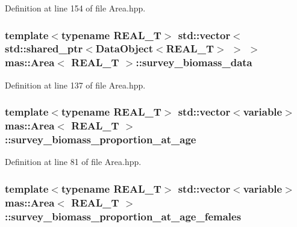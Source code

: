 Definition at line 154 of file Area.\-hpp.

\hypertarget{structmas_1_1_area_a742a11ec29fd3c8cbba9c4fc2ffb650b}{
\subsubsection[{survey\-\_\-biomass\-\_\-data}]{\setlength{\rightskip}{0pt plus 5cm}template$<$typename R\-E\-A\-L\-\_\-\-T$>$ std\-::vector$<$std\-::shared\-\_\-ptr$<${\bf Data\-Object}$<$R\-E\-A\-L\-\_\-\-T$>$ $>$ $>$ {\bf mas\-::\-Area}$<$ R\-E\-A\-L\-\_\-\-T $>$\-::survey\-\_\-biomass\-\_\-data}}\label{structmas_1_1_area_a742a11ec29fd3c8cbba9c4fc2ffb650b}


Definition at line 137 of file Area.\-hpp.

\hypertarget{structmas_1_1_area_a73ef63706809741b03510ccdf85c5c8b}{
\subsubsection[{survey\-\_\-biomass\-\_\-proportion\-\_\-at\-\_\-age}]{\setlength{\rightskip}{0pt plus 5cm}template$<$typename R\-E\-A\-L\-\_\-\-T$>$ std\-::vector$<${\bf variable}$>$ {\bf mas\-::\-Area}$<$ R\-E\-A\-L\-\_\-\-T $>$\-::survey\-\_\-biomass\-\_\-proportion\-\_\-at\-\_\-age}}\label{structmas_1_1_area_a73ef63706809741b03510ccdf85c5c8b}


Definition at line 81 of file Area.\-hpp.

\hypertarget{structmas_1_1_area_a0f91784fa56884376c4ee3d8a2fc0ec3}{
\subsubsection[{survey\-\_\-biomass\-\_\-proportion\-\_\-at\-\_\-age\-\_\-females}]{\setlength{\rightskip}{0pt plus 5cm}template$<$typename R\-E\-A\-L\-\_\-\-T$>$ std\-::vector$<${\bf variable}$>$ {\bf mas\-::\-Area}$<$ R\-E\-A\-L\-\_\-\-T $>$\-::survey\-\_\-biomass\-\_\-proportion\-\_\-at\-\_\-age\-\_\-females}}\label{structmas_1_1_area_a0f91784fa56884376c4ee3d8a2fc0ec3}


